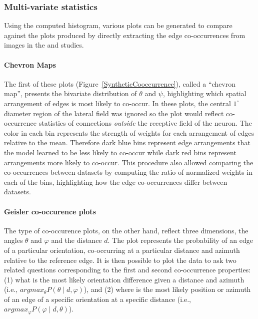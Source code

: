 \subsubsection*{Multi-variate statistics}

Using the computed histogram, various plots can be generated to
compare against the plots produced by directly extracting the edge
co-occurrences from images in the \cite{Perrinet2015} and
\cite{Geisler2001} studies.

\paragraph{Chevron Maps}

The first of these plots (Figure~\ref{SyntheticCooccurrence}), called
a ``chevron map'', presents the bivariate distribution of $\theta$ and
$\psi$, highlighting which spatial arrangement of edges is most likely
to co-occur. In these plots, the central $1^\circ$ diameter region of
the lateral field was ignored so the plot would reflect co-occurrence
statistics of connections \emph{outside} the receptive field of the
neuron. The color in each bin represents the strength of weights for
each arrangement of edges relative to the mean. Therefore dark blue
bins represent edge arrangements that the model learned to be less
likely to co-occur while dark red bins represent arrangements more
likely to co-occur. This procedure also allowed comparing the
co-occurrences between datasets by computing the ratio of normalized
weights in each of the bins, highlighting how the edge co-occurrences
differ between datasets.

\paragraph{Geisler co-occurence plots}

The \cite{Geisler2001} type of co-occurence plots, on the other hand,
reflect three dimensions, the angles $\theta$ and $\varphi$ and the
distance $d$. The plot represents the probability of an edge of a
particular orientation, co-occurring at a particular distance and
azimuth relative to the reference edge. It is then possible to plot
the data to ask two related questions corresponding to the first and
second co-occurrence properties: (1) what is the most likely
orientation difference given a distance and azimuth (i.e.,
$argmax_\theta P(\theta \mid d, \varphi)$), and (2) where is the most
likely position or azimuth of an edge of a specific orientation at a
specific distance (i.e., $argmax_\varphi P(\varphi \mid d,
\theta)$).

